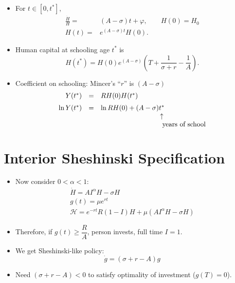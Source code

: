 \documentclass[12pt,compress,handout]{beamer}  %
\begin{document}
\begin{frame}
\begin{itemize}[<+->]
\item For $t\in [0,t^{*}]$,
\begin{align*}
\frac{\dot{H}}H=& (A-\sigma )t+\varphi, \qquad H(0)=H_0 \\[2mm]
H(t)=& e^{(A-\sigma )t}H(0).
\end{align*}

\item Human capital at schooling age $t^{*}$ is
\begin{equation*}
H(t^{*})=H(0)e^{(A-\sigma )}\left(T+\frac{1}{\sigma
+r}-\frac{1}{A}\right).
\end{equation*}

\item Coefficient on schooling: Mincer's ``$r$'' is $(A - \sigma)$
\begin{equation*}
\begin{array}{rcl@{\hspace{0in}}cl}
Y(t^{*}) &=& RH(0)H(t^{*}) & & \\[2mm]
\ln Y(t^{*}) &=& \ln RH(0)+(A-\sigma ) & t^{*} & \\
& & & \uparrow & \\
& & & \multicolumn{2}{l}{\text{years of school}}
\end{array}
\end{equation*}
\end{itemize}
\end{frame}


\section{Interior Sheshinski Specification}
\begin{frame}
\begin{center}
\textbf{\insertsection}
\end{center}
\begin{itemize}[<+->]
\item Now consider $0<\alpha <1$:
\begin{gather*}
\dot{H}=AI^\alpha H-\sigma H \\[2mm]
g(t)=\mu e^{rt} \\[2mm]
\mathcal{H}=e^{-rt}R(1-I)H+\mu (AI^\alpha H-\sigma H)
\end{gather*}

\item Therefore, if $g(t)\geq \dfrac{R}{A}$, person invests, full time $I =
    1$.
\item We get Sheshinski-like policy:
\begin{equation*}
\dot{g}=(\sigma +r-A)g
\end{equation*}

\item Need $(\sigma +r-A)<0$ to satisfy optimality of investment
    ($g(T)=0$).
\end{itemize}
\end{frame}
\end{document}
